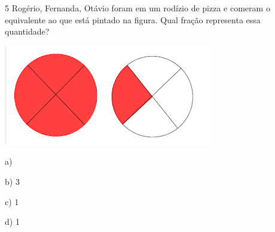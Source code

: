 
\num{5} Rogério, Fernanda, Otávio foram em um rodízio de pizza e comeram o
equivalente ao que está pintado na figura. Qual fração representa essa
quantidade?

\includegraphics[width=3.625in,height=1.72917in]{./imgSAEB_7_MAT/media/image95.png}

a) 

b) 3

c) 1

d) 1




